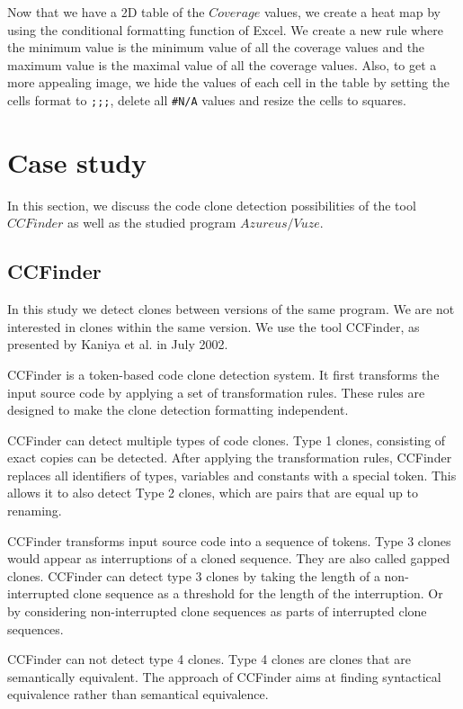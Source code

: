 \documentclass[a4paper,twoside, twocolumn, 11pt]{article}
\numberwithin{equation}{section}
\begin{document}
Now that we have a 2D table of the $Coverage$ values, we create a heat map by using the conditional formatting function of Excel.
We create a new rule where the minimum value is the minimum value of all the coverage values and the maximum value is the maximal value of all the coverage values.
Also, to get a more appealing image, we hide the values of each cell in the table by setting the cells format to \texttt{;;;}, delete all \texttt{\#N/A} values and resize the cells to squares.

\section{Case study}
In this section, we discuss the code clone detection possibilities of the tool $CCFinder$ as well as the studied program $Azureus/Vuze$.

\subsection{CCFinder}
In this study we detect clones between versions of the same program.
We are not interested in clones within the same version.
We use the tool CCFinder, as presented by Kaniya et al. in July 2002.

CCFinder is a token-based code clone detection system. \cite{CCFinder}
It first transforms the input source code by applying a set of transformation rules.
These rules are designed to make the clone detection formatting independent.  

CCFinder can detect multiple types of code clones.
Type 1 clones, consisting of exact copies can be detected. 
After applying the transformation rules, CCFinder replaces all identifiers of types, variables and constants with a special token.
This allows it to also detect Type 2 clones, which are pairs that are equal up to renaming.

CCFinder transforms input source code into a sequence of tokens.
Type 3 clones would appear as interruptions of a cloned sequence. They are also called gapped clones.
CCFinder can detect type 3 clones by taking the length of a non-interrupted clone sequence as a threshold for the length of the interruption.
Or by considering non-interrupted clone sequences as parts of interrupted clone sequences.

CCFinder can not detect type 4 clones.
Type 4 clones are clones that are semantically equivalent. 
The approach of CCFinder aims at finding syntactical equivalence rather than semantical equivalence.
\end{document}
